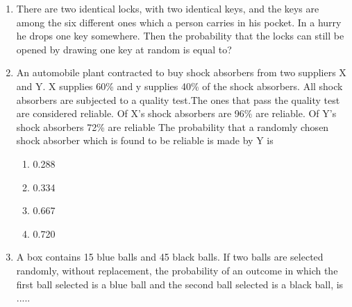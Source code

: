 \documentclass[journal,12pt,twocolumn]{IEEEtran}
\begin{document}
\begin{enumerate}
\begin{enumerate}
\end{enumerate}
%
\solution

%
\item There are two identical locks, with two identical keys, and the keys are among the six different ones which a person carries in his pocket. In a hurry he drops one key somewhere. Then the probability that the locks can still be opened by drawing one key at random is equal to?
%
\solution

%
\item An automobile plant contracted to buy shock absorbers from two suppliers X and Y. X supplies 60\% and y supplies 40\% of the shock absorbers. All shock absorbers are subjected to a quality test.The ones that pass the quality test are considered reliable. Of X's shock absorbers are 96\% are reliable. Of Y's shock absorbers 72\% are reliable The probability that a randomly chosen shock absorber which is found to be reliable is made by Y is
\begin{enumerate}
    \item 0.288
    \item 0.334
    \item 0.667
    \item 0.720
\end{enumerate}
%
\solution

%
\item A box contains 15 blue balls and 45 black balls. If two balls are selected randomly, without replacement, the probability of an outcome in which the first ball selected is a blue ball and the second ball selected is a black ball, is .....


\end{enumerate}
\end{document}
